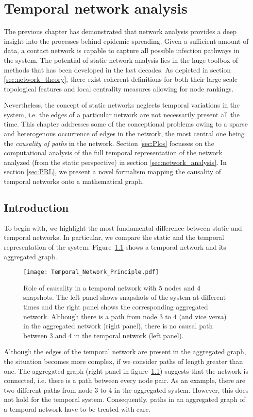 \chapter{Temporal network analysis}\label{sec:temporal_networks}
The previous chapter has demonstrated that network analysis provides a deep insight into the processes behind epidemic spreading.
Given a sufficient amount of data, a contact network is capable to capture all possible infection pathways in the system.
The potential of static network analysis lies in the huge toolbox of methods that has been developed in the last decades.
As depicted in section \ref{sec:network_theory}, there exist coherent definitions for both their large scale topological features and local centrality measures allowing for node rankings.

Nevertheless, the concept of static networks neglects temporal variations in the system, i.e. the edges of a particular network are not necessarily present all the time.
This chapter addresses some of the conceptional problems owing to a sparse and heterogenous occurrence of edges in the network, the most central one being the \emph{causality of paths} in the network.
Section \ref{sec:Plos} focusses on the computational analysis of the full temporal representation of the network analyzed (from the static perspective) in section \ref{sec:network_analysis}.
In section \ref{sec:PRL}, we present a novel formalism mapping the causality of temporal networks onto a mathematical graph.

\section{Introduction}
To begin with, we highlight the most fundamental difference between static and temporal networks.
In particular, we compare the static and the temporal representation of the system.
Figure~\ref{fig:temporal_network_principle} shows a temporal network and its aggregated graph.
%
\begin{figure}[htb]
\begin{center}
\texttt{[image: Temporal\_Network\_Principle.pdf]}
\caption{%
Role of causality in a temporal network with $5$ nodes and $4$ snapshots.
The left panel shows snapshots of the system at different times and the right panel shows the corresponding aggregated network.
Although there is a path from node $3$ to $4$ (and vice versa) in the aggregated network (right panel), there is no causal path between $3$ and $4$ in the temporal network (left panel).
}
\label{fig:temporal_network_principle}
\end{center}
\end{figure}
%
Although the edges of the temporal network are present in the aggregated graph, the situation becomes more complex, if we consider paths of length greater than one.
The aggregated graph (right panel in figure~\ref{fig:temporal_network_principle}) suggests that the network is connected, i.e. there is a path between every node pair.
As an example, there are two different paths from node $3$ to $4$ in the aggregated system.
However, this does not hold for the temporal system.
Consequently, paths in an aggregated graph of a temporal network have to be treated with care.

